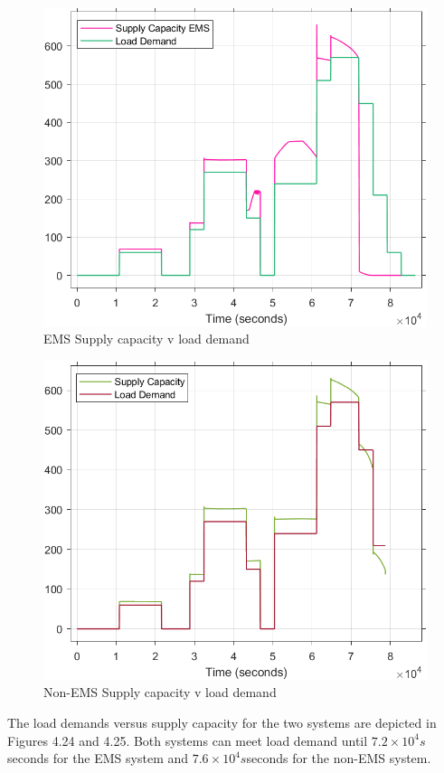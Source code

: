 \begin{figure}[H]
	\centering
	\includegraphics[totalheight=8cm]{Figures/ems supply capacity v load demand.png}
	\caption{EMS Supply capacity v load demand}
\end{figure}
\begin{figure}[H]
	\centering
	\includegraphics[totalheight=8cm]{Figures/non-ems supply capacity v load demand1.png}
	\caption{Non-EMS Supply capacity v load demand}
\end{figure}
The load demands versus supply capacity for the two systems are depicted in Figures 4.24 and 4.25. Both systems can meet load demand until ${7.2\times10^4 s}$ seconds for the EMS system and ${7.6\times10^4 s}$seconds for the non-EMS system.

